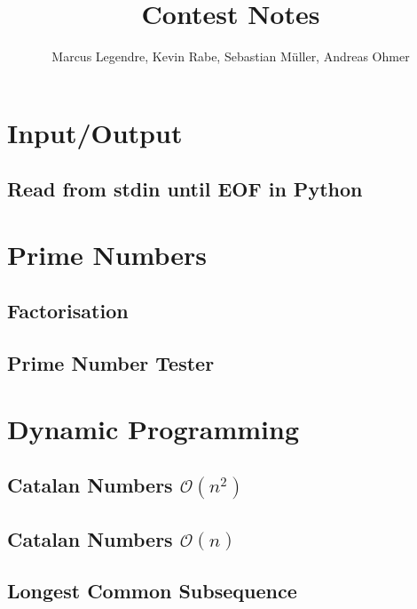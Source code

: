 \documentclass[11pt]{article}
\title{Contest Notes}
\author{Marcus Legendre, Kevin Rabe, Sebastian Müller, Andreas Ohmer}
\date{}
\begin{document}
\maketitle

\tableofcontents


\section{Input/Output}

\subsection{Read from stdin until EOF in Python}



\section{Prime Numbers}

\subsection{Factorisation}


\subsection{Prime Number Tester}



\section{Dynamic Programming}

\subsection{Catalan Numbers $\mathcal{O}(n^2)$}


\subsection{Catalan Numbers $\mathcal{O}(n)$}


\subsection{Longest Common Subsequence}

\end{document}
